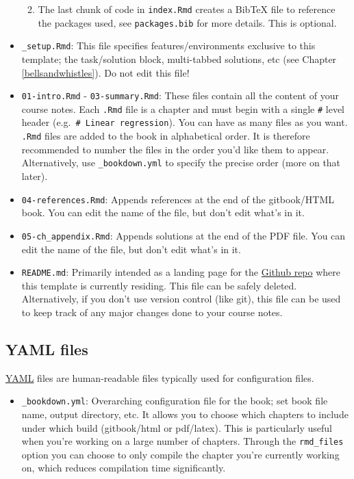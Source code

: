 \documentclass[
  british,
  oneside]{krantz}
\providecommand{\tightlist}{%
  \setlength{\itemsep}{0pt}\setlength{\parskip}{0pt}}
\theoremstyle{definition}
\theoremstyle{definition}
\theoremstyle{definition}
\theoremstyle{definition}
\theoremstyle{remark}
\begin{document}
\begin{itemize}
  \begin{enumerate}
  \def\labelenumi{\arabic{enumi}.}
  \setcounter{enumi}{4}
  \tightlist
  \item
    The last chunk of code in \texttt{index.Rmd} creates a BibTeX file to reference the packages used, see \texttt{packages.bib} for more details. This is optional.
  \end{enumerate}
\item
  \texttt{\_setup.Rmd}: This file specifies features/environments exclusive to this template; the task/solution block, multi-tabbed solutions, etc (see Chapter \ref{bellsandwhistles}).
  Do not edit this file!
\item
  \texttt{01-intro.Rmd} - \texttt{03-summary.Rmd}: These files contain all the content of your course notes. Each \texttt{.Rmd} file is a chapter and must begin with a single \texttt{\#} level header (e.g.~\texttt{\#\ Linear\ regression}). You can have as many files as you want. \texttt{.Rmd} files are added to the book in alphabetical order. It is therefore recommended to number the files in the order you'd like them to appear. Alternatively, use \texttt{\_bookdown.yml} to specify the precise order (more on that later).
\item
  \texttt{04-references.Rmd}: Appends references at the end of the gitbook/HTML book. You can edit the name of the file, but don't edit what's in it.
\item
  \texttt{05-ch\_appendix.Rmd}: Appends solutions at the end of the PDF file. You can edit the name of the file, but don't edit what's in it.
\item
  \texttt{README.md}: Primarily intended as a landing page for the \href{https://github.com/lindesaysh/StAndrewsTemplateBookdown}{Github repo} where this template is currently residing. This file can be safely deleted. Alternatively, if you don't use version control (like git), this file can be used to keep track of any major changes done to your course notes.
\end{itemize}

\hypertarget{yaml-files}{%
\subsection*{YAML files}\label{yaml-files}}


\href{https://en.wikipedia.org/wiki/YAML}{YAML} files are human-readable files typically used for configuration files.

\begin{itemize}
\tightlist
\item
  \texttt{\_bookdown.yml}: Overarching configuration file for the book; set book file name, output directory, etc. It allows you to choose which chapters to include under which build (gitbook/html or pdf/latex). This is particularly useful when you're working on a large number of chapters. Through the \texttt{rmd\_files} option you can choose to only compile the chapter you're currently working on, which reduces compilation time significantly.
\end{itemize}
\end{document}
